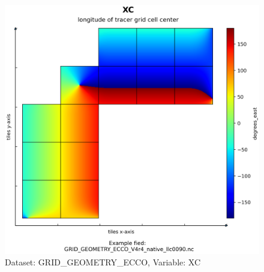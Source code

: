 \begin{figure}[H]
\centering
\includegraphics[scale=0.55]{../images/plots/native_plots_coords/Geometry_Parameters_for_the_Lat-Lon-Cap_90_(llc90)_Native_Model_Grid_(Version_4_Release_4)/XC.png}
\caption{Dataset: GRID\_GEOMETRY\_ECCO, Variable: XC}
\label{tab:table-GRID_GEOMETRY_ECCO_XC-Plot}
\end{figure}
\pagebreak
